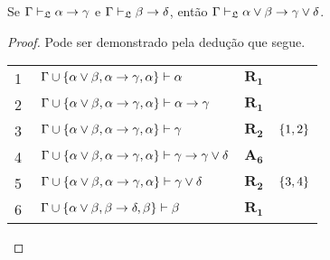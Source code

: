 \begin{tcolorbox}[enhanced jigsaw, breakable, sharp corners, colframe=black, colback=white, boxrule=0.5pt, left=1.5mm, right=1.5mm, top=1.5mm, bottom=1.5mm]
    \begin{lemma}\label{disjunction.exchange}
        Se $\Gamma\mathrel{\vdash}_\mathfrak{L}\alpha\to\gamma$ e $\Gamma\mathrel{\vdash}_\mathfrak{L}\beta\to\delta$, então $\Gamma\mathrel{\vdash}_\mathfrak{L}\alpha\vee\beta\to\gamma\vee\delta$.
        \begin{proof}
        Pode ser demonstrado pela dedução que segue.

        \vspace{0.5\baselineskip}
        \footnotesize
        \setlength{\rowskip}{0.5\baselineskip}
        \begin{xltabular}{\textwidth}{r | X l l}
            \scriptsize{\phantom{0}1}\phantom{ } & $\ \Gamma\cup\set{\alpha\vee\beta,\alpha\to\gamma,\alpha}\vdash\alpha$                                                                  & $\hyperref[modal.rule.1]{\mathbf{R_1}}$\phantom{1} & \\[\rowskip]
            \scriptsize{\phantom{0}2}\phantom{ } & $\ \Gamma\cup\set{\alpha\vee\beta,\alpha\to\gamma,\alpha}\vdash\alpha\to\gamma$                                                         & $\hyperref[modal.rule.1]{\mathbf{R_1}}$            & \\[\rowskip]
            \scriptsize{\phantom{0}3}\phantom{ } & $\ \Gamma\cup\set{\alpha\vee\beta,\alpha\to\gamma,\alpha}\vdash\gamma$                                                                  & $\hyperref[modal.rule.2]{\mathbf{R_2}}$            & $\left\{1,2\right\}$\\[\rowskip]
            \scriptsize{\phantom{0}4}\phantom{ } & $\ \Gamma\cup\set{\alpha\vee\beta,\alpha\to\gamma,\alpha}\vdash\gamma\to\gamma\vee\delta$                                               & $\hyperref[modal.axiom.6]{\mathbf{A_6}}$           & \\[\rowskip]
            \scriptsize{\phantom{0}5}\phantom{ } & $\ \Gamma\cup\set{\alpha\vee\beta,\alpha\to\gamma,\alpha}\vdash\gamma\vee\delta$                                                        & $\hyperref[modal.rule.2]{\mathbf{R_2}}$            & $\left\{3,4\right\}$\\[\rowskip]
            \scriptsize{\phantom{0}6}\phantom{ } & $\ \Gamma\cup\set{\alpha\vee\beta,\beta\to\delta,\beta}\vdash\beta$                                                                     & $\hyperref[modal.rule.1]{\mathbf{R_1}}$            & \\[\rowskip]

\end{xltabular}
\end{proof}
\end{lemma}
\end{tcolorbox}
